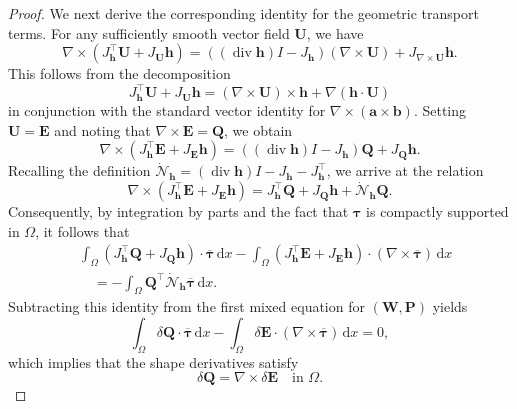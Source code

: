 \documentclass[12pt,reqno]{amsart}
\theoremstyle{definition}
\numberwithin{equation}{section}
\begin{document}
\begin{proof}
We next derive the corresponding identity for the geometric transport terms. For any sufficiently smooth vector field $\mathbf{U}$, we have
\[
\nabla\times
\left(
J_{\mathbf{h}}^{\top}\mathbf{U}+J_{\mathbf{U}}\mathbf{h}
\right)
=
\left((\operatorname{div}\mathbf{h})I-J_{\mathbf{h}}\right)
(\nabla\times\mathbf{U})
+
J_{\nabla\times\mathbf{U}}\mathbf{h} .
\]
This follows from the decomposition 
\[
J_{\mathbf{h}}^{\top}\mathbf{U}+J_{\mathbf{U}}\mathbf{h}
=
(\nabla\times\mathbf{U})\times\mathbf{h}
+
\nabla(\mathbf{h}\cdot\mathbf{U})
\]
in conjunction with the standard vector identity for $\nabla\times(\mathbf{a}\times\mathbf{b})$. Setting $\mathbf{U}=\mathbf{E}$ and noting that $\nabla\times\mathbf{E}=\mathbf{Q}$, we obtain
\[
\nabla\times
\left(
J_{\mathbf{h}}^{\top}\mathbf{E}+J_{\mathbf{E}}\mathbf{h}
\right)
=
\left((\operatorname{div}\mathbf{h})I-J_{\mathbf{h}}\right)\mathbf{Q}
+
J_{\mathbf{Q}}\mathbf{h} .
\]
Recalling the definition $\dot{\mathcal{N}}_{\mathbf{h}} = (\operatorname{div}\mathbf{h})I-J_{\mathbf{h}}-J_{\mathbf{h}}^{\top}$, we arrive at the relation
\[
\nabla\times
\left(
J_{\mathbf{h}}^{\top}\mathbf{E}+J_{\mathbf{E}}\mathbf{h}
\right)
=
J_{\mathbf{h}}^{\top}\mathbf{Q}+J_{\mathbf{Q}}\mathbf{h}
+
\dot{\mathcal{N}}_{\mathbf{h}}\mathbf{Q} .
\]
Consequently, by integration by parts and the fact that $\boldsymbol{\tau}$ is compactly supported in $\Omega$, it follows that
\[
\begin{aligned}
&\int_\Omega
\left(J_{\mathbf{h}}^{\top}\mathbf{Q}+J_{\mathbf{Q}}\mathbf{h}\right)
\cdot\overline{\boldsymbol{\tau}}\,\mathrm{d}x
-\int_\Omega
\left(J_{\mathbf{h}}^{\top}\mathbf{E}+J_{\mathbf{E}}\mathbf{h}\right)
\cdot(\nabla\times\overline{\boldsymbol{\tau}})\,\mathrm{d}x \\
&\quad = -\int_\Omega \mathbf{Q}^\top\dot{\mathcal{N}}_{\mathbf{h}} \overline{\boldsymbol{\tau}}\,\mathrm{d}x .
\end{aligned}
\]
Subtracting this identity from the first mixed equation for $(\mathbf{W}, \mathbf{P})$ yields
\[
\int_\Omega \delta\mathbf{Q}\cdot\overline{\boldsymbol{\tau}}\,\mathrm{d}x - \int_\Omega \delta\mathbf{E}\cdot(\nabla\times\overline{\boldsymbol{\tau}})\,\mathrm{d}x = 0,
\]
which implies that the shape derivatives satisfy
\[
\delta\mathbf{Q}=\nabla\times\delta\mathbf{E} \quad \text{in } \Omega.
\]



\end{proof}
\end{document}
